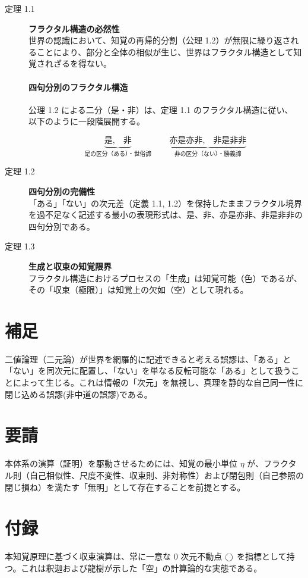 \documentclass[11pt,a4paper]{ltjsarticle}
\begin{document}
\begin{description}
  \item[定理 1.1] \textbf{フラクタル構造の必然性}\\
  世界の認識において、知覚の再帰的分割（公理 1.2）が無限に繰り返されることにより、部分と全体の相似が生じ、世界はフラクタル構造として知覚されざるを得ない。

\paragraph{四句分別のフラクタル構造}
公理 1.2 による二分（是・非）は、定理 1.1 のフラクタル構造に従い、
以下のように一段階展開する。

\[
\underbrace{\text{是},\quad \text{非}}_{\text{是の区分（ある）・世俗諦}}
\qquad
\underbrace{\text{亦是亦非},\quad \text{非是非非}}_{\text{非の区分（ない）・勝義諦}}
\]
  
  \item[定理 1.2] \textbf{四句分別の完備性}\\
  「ある」「ない」の次元差（定義 1.1, 1.2）を保持したままフラクタル境界を過不足なく記述する最小の表現形式は、是、非、亦是亦非、非是非非の四句分別である。
  
  \item[定理 1.3] \textbf{生成と収束の知覚限界}\\
  フラクタル構造におけるプロセスの「生成」は知覚可能（色）であるが、その「収束（極限）」は知覚上の欠如（空）として現れる。
\end{description}

\section{補足}
二値論理（二元論）が世界を網羅的に記述できると考える誤謬は、「ある」と「ない」を同次元に配置し、「ない」を単なる反転可能な「ある」として扱うことによって生じる。これは情報の「次元」を無視し、真理を静的な自己同一性に閉じ込める誤謬(非中道の誤謬)である。

\section{要請}
本体系の演算（証明）を駆動させるためには、知覚の最小単位 $\eta$ が、フラクタル則（自己相似性、尺度不変性、収束則、非対称性）および閉包則（自己参照の閉じ損ね）を満たす「無明」として存在することを前提とする。

\section{付録}
本知覚原理に基づく収束演算は、常に一意な $0$ 次元不動点 $\bigcirc$ を指標として持つ。これは釈迦および龍樹が示した「空」の計算論的な実態である。
\end{document}
